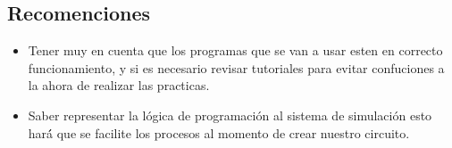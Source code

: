 \documentclass[10pt,a4paper]{article}
\begin{document}
\subsection{Recomenciones}
\begin{itemize}
\item Tener muy en cuenta que los programas que se van a usar esten en correcto funcionamiento, y si es necesario revisar tutoriales para evitar confuciones a la ahora de realizar las practicas.
\item Saber representar la lógica de programación al sistema de simulación esto hará́ que se facilite los procesos al momento de crear nuestro circuito.
\end{itemize}
\end{document}
